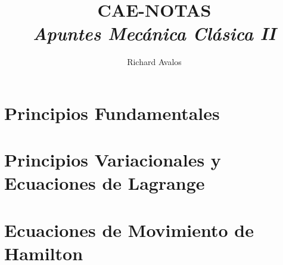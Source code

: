 \documentclass[11pt]{article}
\begin{document}
	\title{{CAE-NOTAS}\\{\normalsize{\itshape Apuntes Mecánica Clásica II}}}
	\author{Richard Avalos}
	\maketitle
	\newpage
 
	\pagestyle{fancynotes}

        \part{Principios Fundamentales}
        

        \part{Principios Variacionales y Ecuaciones de Lagrange}
        

        \part{Ecuaciones de Movimiento de Hamilton}
        
\end{document}
